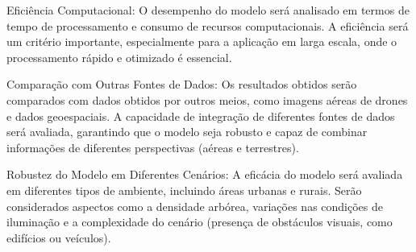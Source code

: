\documentclass[
    12pt,                   %
    openright,              %
    oneside,                %
    a4paper,                %
    sumario=tradicional,    %
    english,                %
    brazil,                 %
    ]{abntex2}
\begin{document}
    Eficiência Computacional: O desempenho do modelo será analisado em termos de tempo de processamento e consumo de recursos computacionais. A eficiência será um critério importante, especialmente para a aplicação em larga escala, onde o processamento rápido e otimizado é essencial.
    
    Comparação com Outras Fontes de Dados: Os resultados obtidos serão comparados com dados obtidos por outros meios, como imagens aéreas de drones e dados geoespaciais. A capacidade de integração de diferentes fontes de dados será avaliada, garantindo que o modelo seja robusto e capaz de combinar informações de diferentes perspectivas (aéreas e terrestres).
    
    Robustez do Modelo em Diferentes Cenários: A eficácia do modelo será avaliada em diferentes tipos de ambiente, incluindo áreas urbanas e rurais. Serão considerados aspectos como a densidade arbórea, variações nas condições de iluminação e a complexidade do cenário (presença de obstáculos visuais, como edifícios ou veículos).

    
    
    
\end{document}
